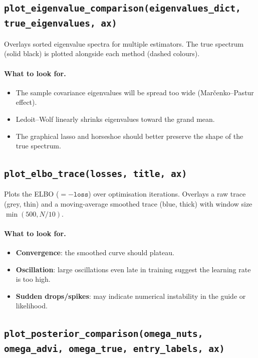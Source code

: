 \documentclass[11pt,a4paper]{article}
\begin{document}
\subsection{\texttt{plot\_eigenvalue\_comparison(eigenvalues\_dict, true\_eigenvalues, ax)}}

Overlays sorted eigenvalue spectra for multiple estimators. The true spectrum (solid black) is plotted alongside each method (dashed colours).

\paragraph{What to look for.}
\begin{itemize}[nosep]
  \item The sample covariance eigenvalues will be spread too wide (Mar\v{c}enko--Pastur effect).
  \item Ledoit--Wolf linearly shrinks eigenvalues toward the grand mean.
  \item The graphical lasso and horseshoe should better preserve the shape of the true spectrum.
\end{itemize}

\subsection{\texttt{plot\_elbo\_trace(losses, title, ax)}}

Plots the ELBO ($= -\texttt{loss}$) over optimisation iterations. Overlays a raw trace (grey, thin) and a moving-average smoothed trace (blue, thick) with window size $\min(500, N/10)$.

\paragraph{What to look for.}
\begin{itemize}[nosep]
  \item \textbf{Convergence}: the smoothed curve should plateau.
  \item \textbf{Oscillation}: large oscillations even late in training suggest the learning rate is too high.
  \item \textbf{Sudden drops/spikes}: may indicate numerical instability in the guide or likelihood.
\end{itemize}

\subsection{\texttt{plot\_posterior\_comparison(omega\_nuts, omega\_advi, omega\_true, entry\_labels, ax)}}
\end{document}
